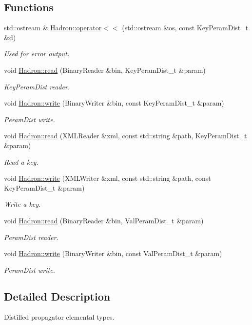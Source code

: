 \subsection*{Functions}
\begin{DoxyCompactItemize}
\item 
std\+::ostream \& \mbox{\hyperlink{namespaceHadron_a42b0be53de314a1cf2c05e7d4d4a34d9}{Hadron\+::operator$<$$<$}} (std\+::ostream \&os, const Key\+Peram\+Dist\+\_\+t \&d)
\begin{DoxyCompactList}\small\item\em Used for error output. \end{DoxyCompactList}\item 
void \mbox{\hyperlink{namespaceHadron_ac70286e9fd2f4a9ddf81f9235d1812e8}{Hadron\+::read}} (Binary\+Reader \&bin, Key\+Peram\+Dist\+\_\+t \&param)
\begin{DoxyCompactList}\small\item\em Key\+Peram\+Dist reader. \end{DoxyCompactList}\item 
void \mbox{\hyperlink{namespaceHadron_a1f7e7b8c782fddd330a9f4491bd37e22}{Hadron\+::write}} (Binary\+Writer \&bin, const Key\+Peram\+Dist\+\_\+t \&param)
\begin{DoxyCompactList}\small\item\em Peram\+Dist write. \end{DoxyCompactList}\item 
void \mbox{\hyperlink{namespaceHadron_a55b9ba85a8d8e17d95217275193fb013}{Hadron\+::read}} (X\+M\+L\+Reader \&xml, const std\+::string \&path, Key\+Peram\+Dist\+\_\+t \&param)
\begin{DoxyCompactList}\small\item\em Read a key. \end{DoxyCompactList}\item 
void \mbox{\hyperlink{namespaceHadron_a9d260315c8fc49d172ff22fd3abb49c9}{Hadron\+::write}} (X\+M\+L\+Writer \&xml, const std\+::string \&path, const Key\+Peram\+Dist\+\_\+t \&param)
\begin{DoxyCompactList}\small\item\em Write a key. \end{DoxyCompactList}\item 
void \mbox{\hyperlink{namespaceHadron_a030f71bff6ae10166b42e24845e0dbf8}{Hadron\+::read}} (Binary\+Reader \&bin, Val\+Peram\+Dist\+\_\+t \&param)
\begin{DoxyCompactList}\small\item\em Peram\+Dist reader. \end{DoxyCompactList}\item 
void \mbox{\hyperlink{namespaceHadron_afebbe26d622d0f830042509739bee2da}{Hadron\+::write}} (Binary\+Writer \&bin, const Val\+Peram\+Dist\+\_\+t \&param)
\begin{DoxyCompactList}\small\item\em Peram\+Dist write. \end{DoxyCompactList}\end{DoxyCompactItemize}


\subsection{Detailed Description}
Distilled propagator elemental types. 


